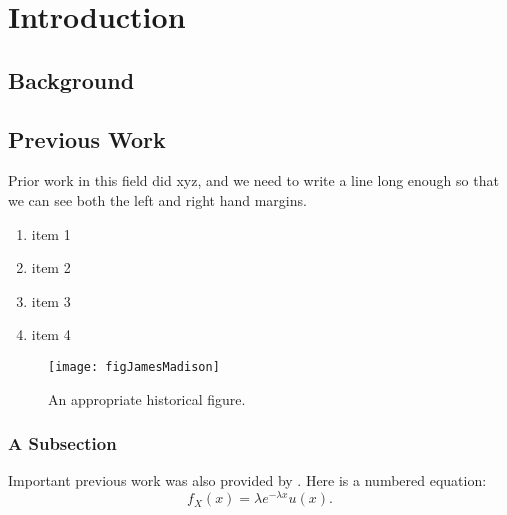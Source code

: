 

\chapter[Introduction]{Introduction}

\section{Background}
\section{Previous Work} %

Prior work in this field did xyz, and we need to write a line long enough so that we can see both the left and right hand margins.

\begin{enumerate}
  \item item 1
  
  \item item 2
  
  \item item 3
  
  \item item 4 
\end{enumerate}


\begin{figure}
  \centering
  \texttt{[image: figJamesMadison]}
  \caption[An appropriate historical figure]{An appropriate historical figure.}

  \figSpace
\end{figure}

\newpage

\subsection{A Subsection}

Important previous work was also provided by \cite{Shannon49}.  Here is a numbered equation:
\begin{equation}
    f_X(x) = \lambda e^{-\lambda x} u(x).
\end{equation}

